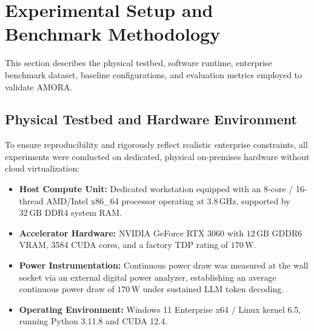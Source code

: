 \section{Experimental Setup and Benchmark Methodology}
\label{sec:experimental_setup}

This section describes the physical testbed, software runtime, enterprise benchmark dataset, baseline configurations, and evaluation metrics employed to validate AMORA.

\subsection{Physical Testbed and Hardware Environment}
To ensure reproducibility and rigorously reflect realistic enterprise constraints, all experiments were conducted on dedicated, physical on-premises hardware without cloud virtualization:
\begin{itemize}
    \item \textbf{Host Compute Unit:} Dedicated workstation equipped with an 8-core / 16-thread AMD/Intel x86\_64 processor operating at $3.8\,\text{GHz}$, supported by $32\,\text{GB}$ DDR4 system RAM.
    \item \textbf{Accelerator Hardware:} NVIDIA GeForce RTX 3060 with $12\,\text{GB}$ GDDR6 VRAM, 3584 CUDA cores, and a factory TDP rating of $170\,\text{W}$.
    \item \textbf{Power Instrumentation:} Continuous power draw was measured at the wall socket via an external digital power analyzer, establishing an average continuous power draw of $170\,\text{W}$ under sustained LLM token decoding.
    \item \textbf{Operating Environment:} Windows 11 Enterprise x64 / Linux kernel 6.5, running Python 3.11.8 and CUDA 12.4.
\end{itemize}

